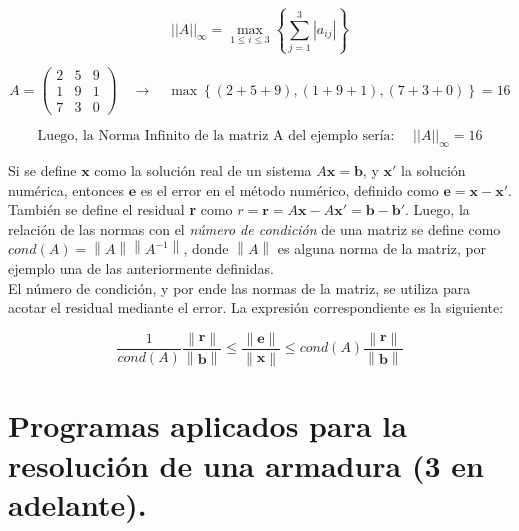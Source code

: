 \documentclass[12pt, notitlepage]{article}
\newcommand{\norm}[1]{\left\lVert#1\right\rVert}
\begin{document}
\begin{equation*}
||A||_\infty = \max\limits_{1\leq i \leq 3} \left\lbrace \sum_{j=1}^3 |a_{ij}| \right\rbrace
\end{equation*}

\begin{equation*}
A = \begin{pmatrix}
2 & 5 & 9 \\
1 & 9 & 1 \\
7 & 3 & 0
\end{pmatrix} \quad \rightarrow \quad \max\left\lbrace (2+5+9),(1+9+1),(7+3+0)\right\rbrace = 16
\end{equation*}

\begin{equation*}
\text{Luego, la Norma Infinito de la matriz A del ejemplo sería: } \quad ||A||_\infty = 16
\end{equation*}

Si se define $\textbf{x}$ como la solución real de un sistema $A\textbf{x} = \textbf{b}$, y $\textbf{x}'$ la solución numérica, entonces $\textbf{e}$ es el error en el método numérico, definido como $\mathbf{e} = \mathbf{x} - \mathbf{x}'$.\\
También se define el residual \textbf{r} como $r = \mathbf{r} = A\mathbf{x} - A\mathbf{x}' = \mathbf{b} - \mathbf{b}'$. Luego, la relación de las normas con el \textit{número de condición} de una matriz se define como $cond(A) = \norm{A}\norm{A^{-1}}$, donde $\norm{A}$ es alguna norma de la matriz, por ejemplo una de las anteriormente definidas.\\

El número de condición, y por ende las normas de la matriz, se utiliza para acotar el residual mediante el error. La expresión correspondiente es la siguiente:

\begin{equation*}
\frac{1}{cond(A)} \frac{\norm{\mathbf{r}}}{\norm{\mathbf{b}}} \leq \frac{\norm{\mathbf{e}}}{\norm{\mathbf{x}}} \leq cond(A)\frac{\norm{\mathbf{r}}}{\norm{\mathbf{b}}}
\end{equation*}

\newpage

\section{Programas aplicados para la resolución de una armadura (3 en adelante).}



\newpage
\end{document}
